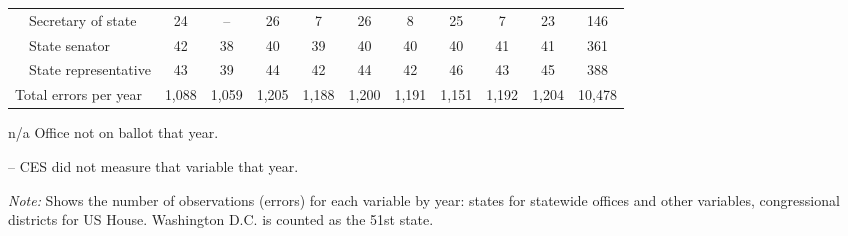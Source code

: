 \begin{table}[!htbp]
{\begin{threeparttable}
\begin{tabular}{lcccccccccc}
~~Secretary of state & 24 & -- & 26 & 7 & 26 & 8 & 25 & 7 & 23 & 146 \\
~~State senator & 42 & 38 & 40 & 39 & 40 & 40 & 40 & 41 & 41 & 361 \\
~~State representative & 43 & 39 & 44 & 42 & 44 & 42 & 46 & 43 & 45 & 388 \\
\midrule
Total errors per year & 1,088 & 1,059 & 1,205 & 1,188 & 1,200 & 1,191 & 1,151 & 1,192 & 1,204 & 10,478 \\
\bottomrule
\end{tabular}
\begin{tablenotes}
\footnotesize
\item n/a Office not on ballot that year.
\item -- CES did not measure that variable that year.
\item \textit{Note:} Shows the number of observations (errors) for each variable by year: states for statewide offices and other variables, congressional districts for US House. Washington D.C. is counted as the 51st state.
\end{tablenotes}
\end{threeparttable}%
}
\end{table}